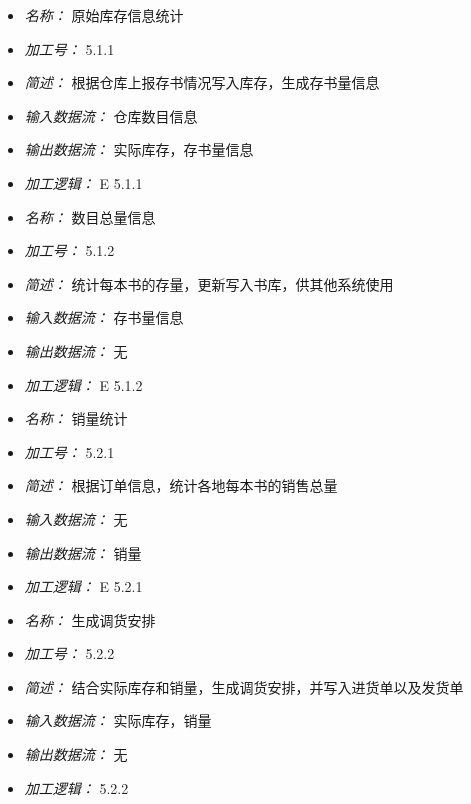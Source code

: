 \begin{itemize}
\item \textit{名称： } 原始库存信息统计
\item \textit{加工号： }5.1.1
\item \textit{简述： } 根据仓库上报存书情况写入库存，生成存书量信息 
\item \textit{输入数据流： } 仓库数目信息
\item \textit{输出数据流： } 实际库存，存书量信息
\item \textit{加工逻辑： } E 5.1.1

\end{itemize}


\vspace{-1mm}


\begin{itemize}
\item \textit{名称： } 数目总量信息
\item \textit{加工号： }5.1.2
\item \textit{简述： } 统计每本书的存量，更新写入书库，供其他系统使用 
\item \textit{输入数据流： } 存书量信息
\item \textit{输出数据流： } 无
\item \textit{加工逻辑： } E 5.1.2

\end{itemize}


\vspace{-1mm}


\begin{itemize}
\item \textit{名称： }销量统计
\item \textit{加工号： }5.2.1
\item \textit{简述： } 根据订单信息，统计各地每本书的销售总量 
\item \textit{输入数据流： } 无
\item \textit{输出数据流： } 销量
\item \textit{加工逻辑： } E 5.2.1

\end{itemize}


\vspace{-1mm}


\begin{itemize}
\item \textit{名称： }生成调货安排
\item \textit{加工号： }5.2.2
\item \textit{简述： } 结合实际库存和销量，生成调货安排，并写入进货单以及发货单 
\item \textit{输入数据流： } 实际库存，销量
\item \textit{输出数据流： } 无
\item \textit{加工逻辑： } 5.2.2

\end{itemize}


